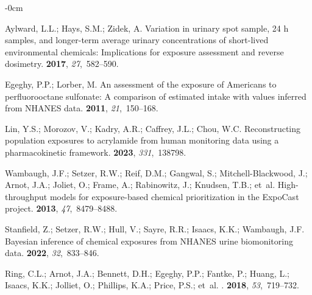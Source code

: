 \documentclass[toxics,article,accept,pdftex,moreauthors]{Definitions/mdpi}
\begin{document}
\begin{adjustwidth}{-\extralength}{0cm}
\begin{thebibliography}{999}
Aylward, L.L.; Hays, S.M.; Zidek, A.
\newblock Variation in urinary spot sample, 24 h samples, and longer-term
  average urinary concentrations of short-lived environmental chemicals:
  Implications for exposure assessment and reverse dosimetry.
 {\bf
  2017}, {\em 27},~582--590.

Egeghy, P.P.; Lorber, M.
\newblock An assessment of the exposure of Americans to perfluorooctane
  sulfonate: A comparison of estimated intake with values inferred from NHANES
  data.
 {\bf
  2011}, {\em 21},~150--168.

Lin, Y.S.; Morozov, V.; Kadry, A.R.; Caffrey, J.L.; Chou, W.C.
\newblock Reconstructing population exposures to acrylamide from human
  monitoring data using a pharmacokinetic framework.
 {\bf 2023}, {\em 331},~138798.

Wambaugh, J.F.; Setzer, R.W.; Reif, D.M.; Gangwal, S.; Mitchell-Blackwood, J.;
  Arnot, J.A.; Joliet, O.; Frame, A.; Rabinowitz, J.; Knudsen, T.B.;  et~al.
\newblock High-throughput models for exposure-based chemical prioritization in
  the ExpoCast project.
 {\bf 2013}, {\em
  47},~8479--8488.

Stanfield, Z.; Setzer, R.W.; Hull, V.; Sayre, R.R.; Isaacs, K.K.; Wambaugh,
  J.F.
\newblock Bayesian inference of chemical exposures from NHANES urine
  biomonitoring data.
 {\bf
  2022}, {\em 32},~833--846.

Ring, C.L.; Arnot, J.A.; Bennett, D.H.; Egeghy, P.P.; Fantke, P.; Huang, L.;
  Isaacs, K.K.; Jolliet, O.; Phillips, K.A.; Price, P.S.;  et~al.
.
 {\bf 2018}, {\em
  53},~719--732.


\end{thebibliography}
\end{adjustwidth}
\end{document}
